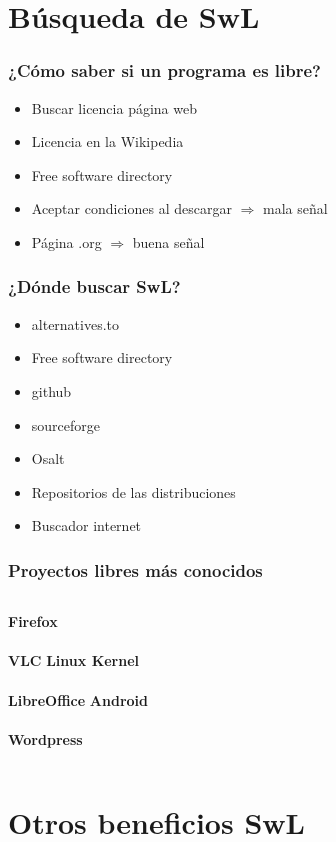 \documentclass{beamer}
\begin{document}
\section{Búsqueda de SwL}

\begin{frame}\frametitle{¿Cómo saber si un programa es libre?}
    \begin{itemize}
        \item Buscar licencia página web
        \item Licencia en la Wikipedia
        \item Free software directory
        \item Aceptar condiciones al descargar $\Rightarrow$ mala señal
        \item Página .org $\Rightarrow$ buena señal
    \end{itemize}
\end{frame}

\begin{frame}\frametitle{¿Dónde buscar SwL?}
    \begin{itemize}
        \item alternatives.to
        \item Free software directory
        \item github
        \item sourceforge
        \item Osalt
        \item Repositorios de las distribuciones
        \item Buscador internet
    \end{itemize}
\end{frame}

\begin{frame}\frametitle{Proyectos libres más conocidos}
    \begin{columns}[c]
    \textbf{Firefox} \\~\\
    \textbf{VLC} 
    \textbf{Linux Kernel} \\~\\
    \textbf{LibreOffice} 
    \textbf{Android} \\~\\
    \textbf{Wordpress} 
    \end{columns}
\end{frame}

\section{Otros beneficios SwL}
\end{document}
